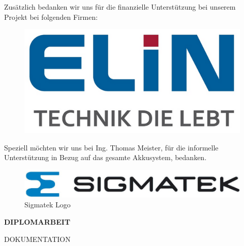 \newpage
Zusätzlich bedanken wir uns für die finanzielle Unterstützung bei unserem Projekt bei folgenden Firmen:

\begin{figure}[H]
	\begin{center}
		\includegraphics[scale=0.5]{figures/allgemein/Elin Logo.png}
	\end{center}
\end{figure}
Speziell möchten wir uns bei Ing. Thomas Meister, für die informelle Unterstützung in Bezug auf das gesamte Akkusystem, bedanken.
\vspace{1cm}

\begin{figure}[H]
	\begin{center}
		\includegraphics[scale=0.7]{figures/allgemein/Sigmatek_LOGO.jpg}
		\caption{Sigmatek Logo}
	\end{center}
\end{figure}


\newpage
\thispagestyle{empty}
\mbox{}
\newpage


\centering
\begin{huge}
\textbf{DIPLOMARBEIT}
\end{huge}

\begin{large}
DOKUMENTATION
\end{large}

